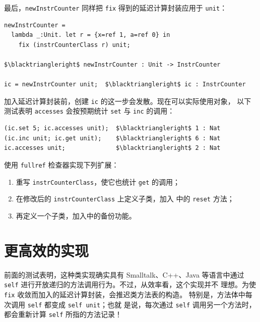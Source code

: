 最后，\texttt{newInstrCounter} 同样把 \texttt{fix} 得到的延迟计算封装应用于
\texttt{unit}：

\begin{lstlisting}[mathescape=true]
newInstrCounter =
  lambda _:Unit. let r = {x=ref 1, a=ref 0} in
    fix (instrCounterClass r) unit;

$\blacktriangleright$ newInstrCounter : Unit -> InstrCounter

ic = newInstrCounter unit;  $\blacktriangleright$ ic : InstrCounter
\end{lstlisting}

加入延迟计算封装前，创建 \texttt{ic} 的这一步会发散。现在可以实际使用对象，
以下测试表明 \texttt{accesses} 会按预期统计 \texttt{set} 与
\texttt{inc} 的调用：

\begin{lstlisting}[mathescape=true]
(ic.set 5; ic.accesses unit);  $\blacktriangleright$ 1 : Nat
(ic.inc unit; ic.get unit);    $\blacktriangleright$ 6 : Nat
ic.accesses unit;              $\blacktriangleright$ 2 : Nat
\end{lstlisting}

\begin{exercise}
\label{ex:18.11.1}
使用 \texttt{fullref} 检查器实现下列扩展：
\begin{enumerate}
\item 重写 \texttt{instrCounterClass}，使它也统计 \texttt{get} 的调用；
\item 在修改后的 \texttt{instrCounterClass} 上定义子类，加入
  中的 \texttt{reset} 方法；
\item 再定义一个子类，加入中的备份功能。
\end{enumerate}
\end{exercise}

\section{更高效的实现}
\label{sec:18.12}

前面的测试表明，这种类实现确实具有 Smalltalk、C++、Java 等语言中通过
\texttt{self} 进行开放递归的方法调用行为。不过，从效率看，这个实现并不
理想。为使 \texttt{fix} 收敛而加入的延迟计算封装，会推迟类方法表的构造。
特别是，方法体中每次调用 \texttt{self} 都变成 \texttt{self unit}；也就
是说，每次通过 \texttt{self} 调用另一个方法时，都会重新计算
\texttt{self} 所指的方法记录！

